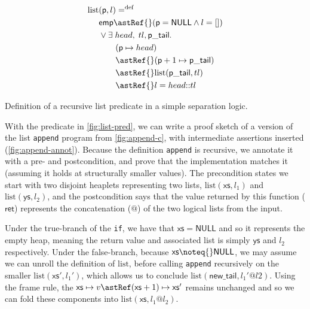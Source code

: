 \begin{marginfigure}
    \centering
    \begin{align*}
        \mathrm{list} &(\mathsf{p}, l) \mathrel{{=}^\mathrm{def}} \\
                      &\mathsf{emp} \astRef{} (\mathsf{p} = \mathsf{NULL} \wedge{} l = []) \\
                      &\vee{} \exists{} \; {head}, \; {tl}, \mathsf{p\_tail}.\\
                      &\qquad (\mathsf{p} \mapsto{} {head}) \\
                      &\qquad \astRef{} (\mathsf{p} + 1 \mapsto{} \mathsf{p\_tail}) \\
                      &\qquad \astRef{} \mathrm{list} (\mathsf{p\_tail}, {tl}) \\
                      &\qquad \astRef{} l = {head} {:}{:} {tl} \\
    \end{align*}
    \caption{Definition of a recursive list predicate in a simple separation
        logic.}\label{fig:list-pred}
\end{marginfigure}

With the predicate in \cref{fig:list-pred}, we can write a proof sketch of a
version of the list \texttt{append} program from \cref{fig:append-c},
with intermediate assertions inserted (\cref{fig:append-annot}). Because the
definition \texttt{append} is recursive, we annotate it with a pre-
and postcondition, and prove that the implementation matches it (assuming it
holds at structurally smaller values). The precondition states we start with
two disjoint heaplets representing two  lists,
$\mathrm{list}(\mathsf{xs}, l_1)$ and $\mathrm{list}(\mathsf{ys}, l_2)$, and
the postcondition says that the value returned by this function
($\mathsf{ret}$) represents the concatenation ($@$) of the two logical lists
from the input.

Under the true-branch of the \texttt{if}, we have that $\mathsf{xs} =
\mathsf{NULL}$ and so it represents the empty heap, meaning the return value
and associated  list is simply $\mathsf{ys}$ and $l_2$ respectively.
Under the false-branch, because $\mathsf{xs} \noteq{} \mathsf{NULL}$, we may
assume we can unroll the definition of $\mathrm{list}$, before calling
\texttt{append} recursively on the smaller
$\mathrm{list}(\mathsf{xs}', l_1')$, which allows us to conclude
$\mathrm{list}(\mathsf{new\_tail}, l_1' @ l2)$. Using the frame rule, the
$\mathsf{xs} \mapsto v \astRef (\mathsf{xs} + 1) \mapsto \mathsf{xs}'$ remains
unchanged and so we can fold these components into $\mathrm{list}(\mathsf{xs},
l_1 @ l_2)$.

